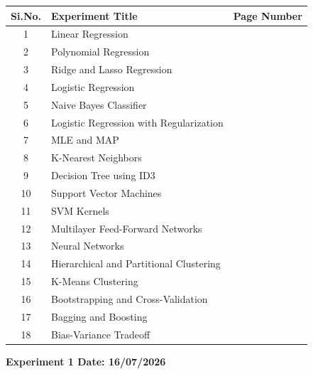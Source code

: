 \documentclass[12pt, a4paper]{report}
\begin{document}
\begin{table}[H]
	\centering
	\renewcommand{\arraystretch}{1.8}
	
	\begin{tabularx}{\textwidth}{@{}|c |X |c|@{}}
		\hline 
		\textbf{Si.No.} & \textbf{Experiment Title} & \textbf{Page Number} \\
		\hline 
		1  & Linear Regression & \pageref{exp:1} \\
		\hline 
		2  & Polynomial Regression & \pageref{exp:2} \\
		\hline 
		3  & Ridge and Lasso Regression & \pageref{exp:3} \\
		\hline 
		4  & Logistic Regression & \pageref{exp:4} \\
		\hline 
		5  & Naive Bayes Classifier & \pageref{exp:5} \\
		\hline 
		6  & Logistic Regression with Regularization & \pageref{exp:6} \\
		\hline 
		7  & MLE and MAP & \pageref{exp:7} \\
		\hline 
		8  & K-Nearest Neighbors & \pageref{exp:8} \\
		\hline 
		9  & Decision Tree using ID3 & \pageref{exp:9} \\
		\hline 
		10 & Support Vector Machines & \pageref{exp:10} \\
		\hline 
		11 & SVM Kernels & \pageref{exp:11} \\
		\hline 
		12 & Multilayer Feed-Forward Networks & \pageref{exp:12} \\
		\hline 
		13 & Neural Networks & \pageref{exp:13} \\
		\hline 
		14 & Hierarchical and Partitional Clustering & \pageref{exp:14} \\
		\hline 
		15 & K-Means Clustering & \pageref{exp:15} \\
		\hline 
		16 & Bootstrapping and Cross-Validation & \pageref{exp:16} \\
		\hline 
		17 & Bagging and Boosting & \pageref{exp:17} \\
		\hline 
		18 & Bias-Variance Tradeoff & \pageref{exp:18} \\
		\hline 
	\end{tabularx}
\end{table}


\newpage 

\begin{center} 
	\bfseries 
	Experiment 1 \hfill Date: 16/07/2026
\end{center}
\end{document}

